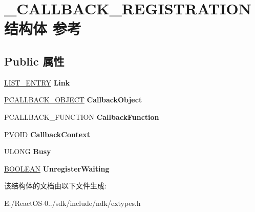\hypertarget{struct___c_a_l_l_b_a_c_k___r_e_g_i_s_t_r_a_t_i_o_n}{}\section{\+\_\+\+C\+A\+L\+L\+B\+A\+C\+K\+\_\+\+R\+E\+G\+I\+S\+T\+R\+A\+T\+I\+O\+N结构体 参考}
\label{struct___c_a_l_l_b_a_c_k___r_e_g_i_s_t_r_a_t_i_o_n}
\subsection*{Public 属性}
\begin{DoxyCompactItemize}
\item 
\mbox{\label{struct___c_a_l_l_b_a_c_k___r_e_g_i_s_t_r_a_t_i_o_n_a7768b83b7fb5c492be8235acb5108f84}} 
\hyperlink{struct___l_i_s_t___e_n_t_r_y}{L\+I\+S\+T\+\_\+\+E\+N\+T\+RY} {\bfseries Link}
\item 
\mbox{\label{struct___c_a_l_l_b_a_c_k___r_e_g_i_s_t_r_a_t_i_o_n_a2561c88966ac8acb8cc3c36f5f2410b0}} 
\hyperlink{struct___c_a_l_l_b_a_c_k___o_b_j_e_c_t}{P\+C\+A\+L\+L\+B\+A\+C\+K\+\_\+\+O\+B\+J\+E\+CT} {\bfseries Callback\+Object}
\item 
\mbox{\label{struct___c_a_l_l_b_a_c_k___r_e_g_i_s_t_r_a_t_i_o_n_a20f7dbbb9f3a9f41f9a5eabdbcb28da4}} 
P\+C\+A\+L\+L\+B\+A\+C\+K\+\_\+\+F\+U\+N\+C\+T\+I\+ON {\bfseries Callback\+Function}
\item 
\mbox{\label{struct___c_a_l_l_b_a_c_k___r_e_g_i_s_t_r_a_t_i_o_n_ae9df4d6d66f431e6366bc506e63a46a9}} 
\hyperlink{interfacevoid}{P\+V\+O\+ID} {\bfseries Callback\+Context}
\item 
\mbox{\label{struct___c_a_l_l_b_a_c_k___r_e_g_i_s_t_r_a_t_i_o_n_a3a900c086d75640d10a6bbcaddd56e35}} 
U\+L\+O\+NG {\bfseries Busy}
\item 
\mbox{\label{struct___c_a_l_l_b_a_c_k___r_e_g_i_s_t_r_a_t_i_o_n_a9fdddb44f312767bb27d8eba08fa63a3}} 
\hyperlink{_processor_bind_8h_a112e3146cb38b6ee95e64d85842e380a}{B\+O\+O\+L\+E\+AN} {\bfseries Unregister\+Waiting}
\end{DoxyCompactItemize}


该结构体的文档由以下文件生成\+:\begin{DoxyCompactItemize}
\item 
E\+:/\+React\+O\+S-\/0../sdk/include/ndk/extypes.\+h\end{DoxyCompactItemize}
